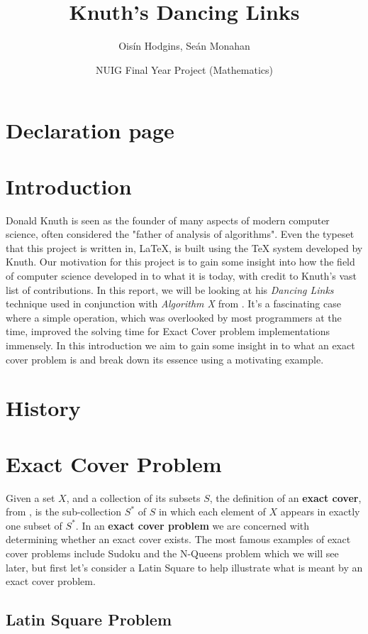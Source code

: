 \documentclass{article}
\title{Knuth's Dancing Links}
\author{Oisín Hodgins, Seán Monahan }
\date{NUIG Final Year Project (Mathematics)}
\begin{document}
\maketitle
\clearpage
\tableofcontents
\clearpage
\section{Declaration page}
\clearpage
\section{Introduction}
Donald Knuth is seen as the founder of many aspects of modern computer science, often considered the "father of analysis of algorithms". Even the typeset that this project is written in, \LaTeX, is built using the \TeX{} system developed by Knuth. Our motivation for this project is to gain some insight into how the field of computer science developed in to what it is today, with credit to Knuth's vast list of  contributions. In this report, we will be looking at his \textit{Dancing Links} technique used in conjunction with \textit{Algorithm X} from \cite{dlx}. It's a fascinating case where a simple operation, which was overlooked by most programmers at the time, improved the solving time for Exact Cover problem implementations immensely. In this introduction we aim to gain some insight in to what an exact cover problem is and break down its essence using a motivating example.
\section{History}
\section{Exact Cover Problem}
Given a set $X$, and a collection of its subsets $S$, the definition of an \textbf{exact cover}, from \cite{exactcover},  is the sub-collection $S^*$ of $S$ in which each element of $X$ appears in exactly one subset of $S^*$. In an \textbf{exact cover problem} we are concerned with determining whether an exact cover exists. The most famous examples of exact cover problems include Sudoku and the N-Queens problem which we will see later, but first let's consider a Latin Square to help illustrate what is meant by an exact cover problem.

\subsection{Latin Square Problem}
\end{document}
